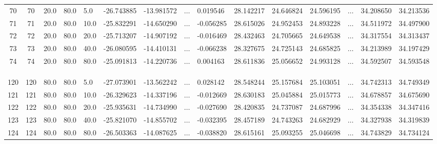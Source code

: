 \begin{table}
{\begin{tabular}{ccp{0.8cm}p{0.8cm}p{0.8cm}p{1.8cm}p{1.8cm}p{0.3cm}p{1.6cm}p{1.6cm}p{1.6cm}p{1.6cm}p{0.3cm}p{1.6cm}p{1.6cm}}
			70 &        70 &  20.0 &  80.0 &   5.0 &      -26.743885 &      -13.981572 &$\dots$&            0.019546 &     28.142217 &     24.646824 &     24.596195 &$\dots$&         34.208650 &         34.213536 \\
			71 &        71 &  20.0 &  80.0 &  10.0 &      -25.832291 &      -14.650290 & $\dots$&          -0.056285 &     28.615026 &     24.952453 &     24.893228 &$\dots$&         34.511972 &         34.497900 \\
			72 &        72 &  20.0 &  80.0 &  20.0 &      -25.713207 &      -14.907192 &$\dots$&           -0.016469 &     28.432463 &     24.705665 &     24.649538& $\dots$&         34.317554 &         34.313437 \\
			73 &        73 &  20.0 &  80.0 &  40.0 &      -26.080595 &      -14.410131 &$\dots$&           -0.066238 &     28.327675 &     24.725143 &     24.685825 &$\dots$&         34.213989 &         34.197429 \\
			74 &        74 &  20.0 &  80.0 &  80.0 &      -25.091813 &      -14.220736 & $\dots$&           0.004163 &     28.611836 &     25.056652 &     24.993128 &$\dots$&         34.592507 &         34.593548 \\
			
			\bottomrule
			&&&&&&&&&&&&&&\\
			&&&&&&&\sbox0{\dots}\makebox[\wd0]{\vdots}&&&&&&&\\
			&&&&&&&&&&&&&&\\
			\toprule
			
			120 &       120 &  80.0 &  80.0 &   5.0 &      -27.073901 &      -13.562242 &$\dots$&            0.028142 &     28.548244 &     25.157684 &     25.103051 &$\dots$&         34.742313 &         34.749349 \\
			121 &       121 &  80.0 &  80.0 &  10.0 &      -26.329623 &      -14.337196 & $\dots$&          -0.012669 &     28.630183 &     25.045884 &     25.015773 & $\dots$&        34.678857 &         34.675690 \\
			122 &       122 &  80.0 &  80.0 &  20.0 &      -25.935631 &      -14.734990 & $\dots$&          -0.027690 &     28.420835 &     24.737087 &     24.687996 & $\dots$&        34.354338 &         34.347416 \\
			123 &       123 &  80.0 &  80.0 &  40.0 &      -25.821070 &      -14.855702 & $\dots$&          -0.032395 &     28.457189 &     24.743263 &     24.682929 &$\dots$&         34.327938 &         34.319839 \\
			124 &       124 &  80.0 &  80.0 &  80.0 &      -26.503363 &      -14.087625 & $\dots$&          -0.038820 &     28.615161 &     25.093255 &     25.046698 & $\dots$&        34.743829 &         34.734124 \\
			\bottomrule[0.5mm]
	\end{tabular}}
\end{table}


